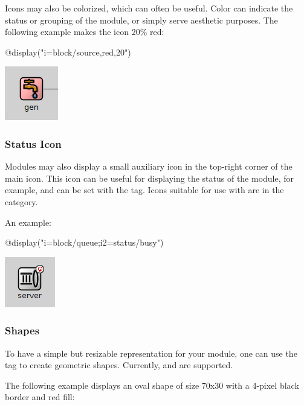 Icons may also be colorized, which can often be useful. Color can indicate
the status or grouping of the module, or simply serve aesthetic purposes.
The following example makes the icon 20\% red:

\begin{ned}
@display("i=block/source,red,20")
\end{ned}

\begin{center}
\includegraphics{figures/graphics-itag}
\end{center}

\subsubsection{Status Icon}

Modules may also display a small auxiliary icon in the top-right corner of
the main icon. This icon can be useful for displaying the status of the
module, for example, and can be set with the  tag. Icons suitable
for use with  are in the  category.

An example:

\begin{ned}
@display("i=block/queue;i2=status/busy")
\end{ned}

\begin{center}
\includegraphics{figures/graphics-i2tag}
\end{center}

\subsubsection{Shapes}

To have a simple but resizable representation for your module, one can use
the  tag to create geometric shapes. Currently,  and
 are supported.

The following example displays an oval shape of size 70x30 with a 4-pixel
black border and red fill:


